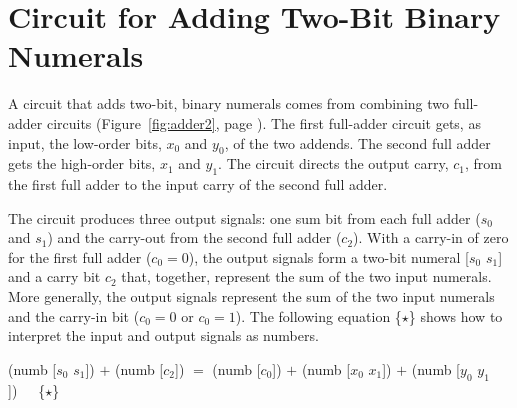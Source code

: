 \section{Circuit for Adding Two-Bit Binary Numerals}
\label{sec:adding-2-bit-numerals}

A circuit that adds two-bit, binary numerals
comes from combining two full-adder circuits
(Figure~\ref{fig:adder2}, page \pageref{fig:adder2}).
The first full-adder circuit gets, as input, the
low-order bits, $x_0$ and $y_0$,  of the two addends.
The second full adder gets the high-order bits,
$x_1$ and $y_1$.
The circuit directs the output carry, $c_1$, from
the first full adder to the input carry of the
second full adder.

The circuit produces three output signals: one sum bit from
each full adder ($s_0$ and $s_1$) and the carry-out
from the second full adder ($c_2$).
With a carry-in of zero for the first full adder
($c_0 = 0$), the output signals form a two-bit
numeral \textsf{[$s_0$ $s_1$]} and a carry bit $c_2$
that, together, represent the sum of the two input numerals.
More generally, the output signals
represent the sum of the two input numerals and the
carry-in bit ($c_0 = 0$ or $c_0 = 1$).
The following equation \{$\star$\} shows how to interpret the
input and output signals as numbers.

\begin{center}
\textsf{(numb [$s_0$ $s_1$]) $+$ (numb [$c_2$])} $=$
\textsf{(numb [$c_0$]) $+$ (numb [$x_0$ $x_1$]) $+$ (numb [$y_0$ $y_1$])}~~~\{$\star$\}
\end{center}

